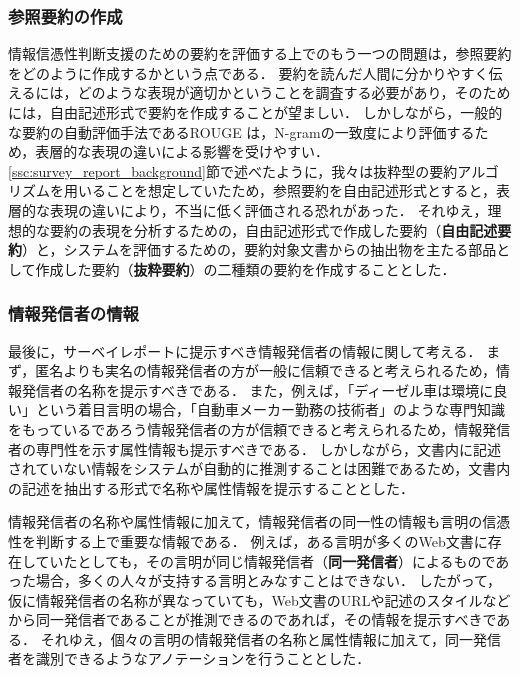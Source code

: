 \documentclass[japanese]{jnlp_1.4}
\begin{document}
\subsubsection{参照要約の作成}

情報信憑性判断支援のための要約を評価する上でのもう一つの問題は，参照要約をどのように作成するかという点である．
要約を読んだ人間に分かりやすく伝えるには，どのような表現が適切かということを調査する必要があり，そのためには，自由記述形式で要約を作成することが望ましい．
しかしながら，一般的な要約の自動評価手法であるROUGE は，N-gramの一致度により評価するため，表層的な表現の違いによる影響を受けやすい．
\ref{ssc:survey_report_background}節で述べたように，我々は抜粋型の要約アルゴリズムを用いることを想定していたため，参照要約を自由記述形式とすると，表層的な表現の違いにより，不当に低く評価される恐れがあった．
それゆえ，理想的な要約の表現を分析するための，自由記述形式で作成した要約（{\bf 自由記述要約}）と，システムを評価するための，要約対象文書からの抽出物を主たる部品として作成した要約（{\bf 抜粋要約}）の二種類の要約を作成することとした．


\subsubsection{情報発信者の情報}

最後に，サーベイレポートに提示すべき情報発信者の情報に関して考える．
まず，匿名よりも実名の情報発信者の方が一般に信頼できると考えられるため，情報発信者の名称を提示すべきである．
また，例えば，「ディーゼル車は環境に良い」という着目言明の場合，「自動車メーカー勤務の技術者」のような専門知識をもっているであろう情報発信者の方が信頼できると考えられるため，情報発信者の専門性を示す属性情報も提示すべきである．
しかしながら，文書内に記述されていない情報をシステムが自動的に推測することは困難であるため，文書内の記述を抽出する形式で名称や属性情報を提示することとした．

情報発信者の名称や属性情報に加えて，情報発信者の同一性の情報も言明の信憑性を判断する上で重要な情報である．
例えば，ある言明が多くのWeb文書に存在していたとしても，その言明が同じ情報発信者（{\bf 同一発信者}）によるものであった場合，多くの人々が支持する言明とみなすことはできない．
したがって，仮に情報発信者の名称が異なっていても，Web文書のURLや記述のスタイルなどから同一発信者であることが推測できるのであれば，その情報を提示すべきである．
それゆえ，個々の言明の情報発信者の名称と属性情報に加えて，同一発信者を識別できるようなアノテーションを行うこととした．
\end{document}
